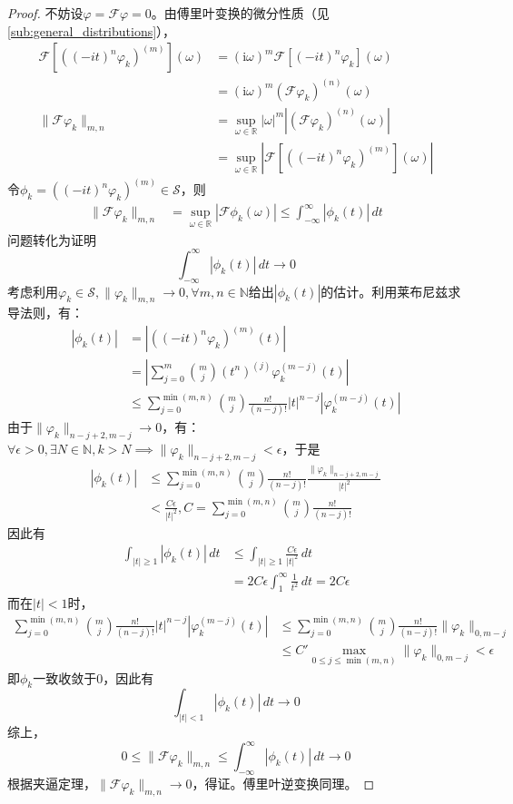 \documentclass{ctexbook}
\begin{document}
\begin{proof}
    不妨设$\varphi=\mathcal{F} \varphi=0$。由傅里叶变换的微分性质（见\ref{sub:general_distributions}），
    \begin{align*}
    \mathcal{F}\left[\left((-it)^n\varphi_k\right)^{(m)}\right](\omega)&=(\mathrm{i}\omega)^m \mathcal{F}\left[(-it)^n \varphi_k\right](\omega)\\
    &=(\mathrm{i}\omega)^m (\mathcal{F} \varphi_k)^{(n)}(\omega)\\
    \|\mathcal{F} \varphi_k\|_{m,n}&=\sup_{\omega\in\mathbb{R} }|\omega|^m\left|(\mathcal{F} \varphi_k)^{(n)}(\omega)\right|\\
    &=\sup_{\omega\in\mathbb{R} }\left|\mathcal{F}\left[((-it)^n \varphi_k)^{(m)}\right](\omega)\right|
\end{align*}
令$\phi_k=\left((-it)^n \varphi_k\right)^{(m)}\in\mathcal{S} $，则
\begin{align*}
    \|\mathcal{F} \varphi_k\|_{m,n}&=\sup_{\omega\in\mathbb{R} }\left|\mathcal{F} \phi_k(\omega)\right|\leq \int_{-\infty}^{\infty}|\phi_k(t)|\,dt
\end{align*}
问题转化为证明\[\int_{-\infty}^{\infty}|\phi_k(t)|\,dt\to 0\]
考虑利用$\varphi_k\in\mathcal{S} ,\|\varphi_k\|_{m,n}\to 0,\forall m,n\in\mathbb{N}$给出$|\phi_k(t)|$的估计。利用莱布尼兹求导法则，有：
\begin{align*}
    |\phi_k(t)|&=\left|\left((-it)^n \varphi_k\right)^{(m)}(t)\right|\\
&=\left|\sum_{j=0}^{m}\binom{m}{j}(t^n)^{(j)}\varphi_k^{(m-j)}(t)\right|\\
    &\leq \sum_{j=0}^{\min(m,n)}\binom{m}{j}\frac{n!}{(n-j)!}|t|^{n-j}\left|\varphi_k^{(m-j)}(t)\right|
\end{align*}
由于$\|\varphi_k\|_{n-j+2,m-j}\to 0$，有：$\forall \epsilon>0,\exists N\in\mathbb{N},k>N\implies \|\varphi_k\|_{n-j+2,m-j}<\epsilon$，于是
\begin{align*}
    |\phi_k(t)|&\leq \sum_{j=0}^{\min(m,n)}\binom{m}{j}\frac{n!}{(n-j)!}\frac{\|\varphi_k\|_{n-j+2,m-j}}{|t|^2}\\
    &<\frac{C\epsilon}{|t|^2},C=\sum_{j=0}^{\min(m,n)}\binom{m}{j}\frac{n!}{(n-j)!}
\end{align*}
因此有\begin{align*}
    \int_{|t|\geq 1}|\phi_k(t)|\,dt&\leq \int_{|t|\geq 1}\frac{C\epsilon}{|t|^2}\,dt\\
    &=2C\epsilon\int_{1}^{\infty}\frac{1}{t^2}\,dt=2C\epsilon
\end{align*}
而在$|t|<1$时，\begin{align*}
    \sum_{j=0}^{\min(m,n)}\binom{m}{j}\frac{n!}{(n-j)!}|t|^{n-j}\left|\varphi_k^{(m-j)}(t)\right|&\leq \sum_{j=0}^{\min(m,n)}\binom{m}{j}\frac{n!}{(n-j)!}\|\varphi_k\|_{0,m-j}\\
    &\leq C'\max_{0\leq j\leq \min(m,n)}\|\varphi_k\|_{0,m-j}<\epsilon
\end{align*}
即$\phi_k$一致收敛于0，因此有
\[\int_{|t|<1}|\phi_k(t)|\,dt\to 0\]
综上，\[0\leq\|\mathcal{F} \varphi_k\|_{m,n}\leq\int_{-\infty}^{\infty}|\phi_k(t)|\,dt\to 0\]
根据夹逼定理，$\|\mathcal{F} \varphi_k\|_{m,n}\to 0$，得证。傅里叶逆变换同理。
\end{proof}
\end{document}
